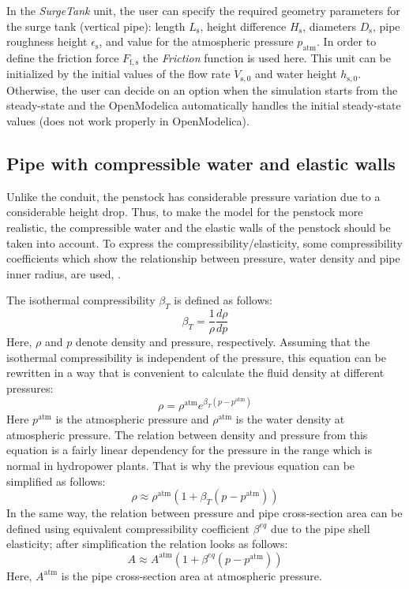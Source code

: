 \documentclass[%
]{USN-PhD}
\begin{document}
In the \emph{SurgeTank} unit, the user can specify the required geometry parameters for the surge tank (vertical pipe): length $L_\mathrm{s}$, height difference $H_\mathrm{s}$, diameters $D_\mathrm{s}$, pipe roughness height $\epsilon_\mathrm{s}$, and value for the atmospheric pressure $p_\mathrm{atm}$. In order to define the friction force $F_\mathrm{f,s}$ the \emph{Friction} function is used here. This unit can be initialized by the initial values of the flow rate $\dot{V}_\mathrm{s,0}$ and water height $h_\mathrm{s,0}$. Otherwise, the user can decide on an option when the simulation starts from the steady-state and the OpenModelica automatically handles the initial steady-state values (does not work properly in OpenModelica).

\subsection{Pipe with compressible water and elastic walls}

Unlike the conduit, the penstock has considerable pressure variation due to a considerable height drop. Thus, to make the model for the penstock more realistic, the compressible water and the elastic walls of the penstock should be taken into account. To express the compressibility/elasticity, some compressibility coefficients which show the relationship between pressure, water density and pipe inner radius, are used, \cite{Sha:11,Vyt:17}.

The isothermal compressibility $\beta_T$ is defined as follows:
\begin{equation}
\beta_T = \frac{1}{\rho}\frac{d\rho}{dp}
\end{equation}
Here, $\rho$ and $p$ denote density and pressure, respectively. Assuming that the isothermal compressibility is independent of the pressure, this equation can be rewritten in a way that is convenient to calculate the fluid density at different pressures:
\begin{equation}
\rho = \rho^{\text{atm}}e^{\beta_T(p-p^{\text{atm}})}
\end{equation}
Here $p^{\text{atm}}$ is the atmospheric pressure and $\rho^{\text{atm}}$ is the water density at atmospheric pressure. The relation between density and pressure from this equation is a fairly linear dependency for the pressure in the range which is normal in hydropower plants. That is why the previous equation can be simplified as follows:
\begin{equation}
\rho \approx \rho^{\text{atm}}(1+{\beta_T(p-p^{\text{atm}})})
\end{equation}
In the same way, the relation between pressure and pipe cross-section area can be defined using equivalent compressibility coefficient $\beta^{eq}$ due to the pipe shell elasticity; after simplification the relation looks as follows:
\begin{equation}
A \approx A^{\text{atm}}(1+{\beta^{eq}(p-p^{\text{atm}})})
\end{equation}
Here, $A^{\text{atm}}$ is the pipe cross-section area at atmospheric pressure.
\end{document}
